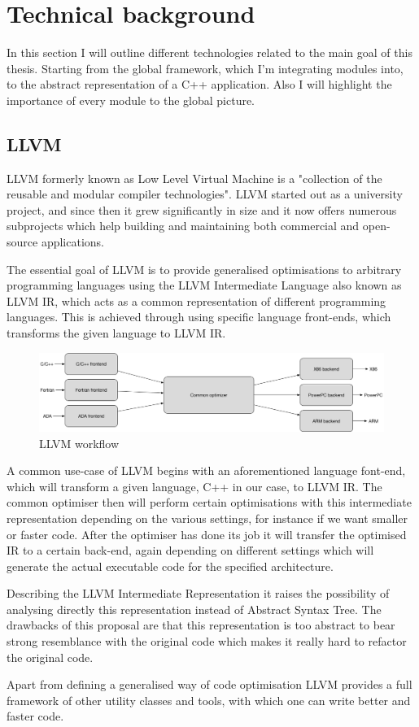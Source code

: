 \section{Technical background}
\par In this section I will outline different technologies related to the main goal of this thesis. Starting from the global framework, which I'm integrating modules into, to the abstract representation of a C++ application. Also I will highlight the importance of every module to the global picture.

\subsection{LLVM}
\par LLVM formerly known as Low Level Virtual Machine is a "collection of the reusable and modular compiler technologies"\cite{llvm_mainpage}. LLVM started out as a university project\cite{LLVM:CGO04}, and since then it grew significantly in size and it now offers numerous subprojects which help building and maintaining both commercial and open-source applications. \medskip
\par The essential goal of LLVM is to provide generalised optimisations to arbitrary programming languages using the LLVM Intermediate Language also known as LLVM IR, which acts as a common representation of different programming languages. This is achieved through using specific language front-ends, which transforms the given language to LLVM IR. 
\begin{figure}[h]
	\caption{LLVM workflow}
	\includegraphics[scale=0.33]{images/llvm_flow}
\end{figure}
\par A common use-case of LLVM begins with an aforementioned language font-end, which will transform a given language, C++ in our case, to LLVM IR. The common optimiser then will perform certain optimisations with this intermediate representation depending on the various settings, for instance if we want smaller or faster code. After the optimiser has done its job it will transfer the optimised IR to a certain back-end, again depending on different settings which will generate the actual executable code for the specified architecture. \medskip
\par Describing the LLVM Intermediate Representation it raises the possibility of analysing directly this representation instead of Abstract Syntax Tree. The drawbacks of this proposal are that this representation is too abstract to bear strong resemblance with the original code which makes it really hard to refactor the original code.
\par Apart from defining a generalised way of code optimisation LLVM provides a full framework of other utility classes and tools, with which one can write better and faster code.

